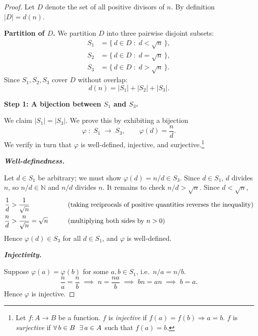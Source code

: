\documentclass[12pt]{article}
\theoremstyle{remark}
\begin{document}
\begin{proof}
Let $D$ denote the set of all positive divisors of $n$.  By definition
$|D| = d(n)$.

\smallskip
\noindent\textbf{Partition of $D$.}\;
We partition $D$ into three pairwise disjoint subsets:
\begin{align*}
    S_1 &= \bigl\{\, d \in D \;:\; d < \sqrt{n} \,\bigr\}, \\
    S_2 &= \bigl\{\, d \in D \;:\; d = \sqrt{n} \,\bigr\}, \\
    S_3 &= \bigl\{\, d \in D \;:\; d > \sqrt{n} \,\bigr\}.
\end{align*}
Since $S_1, S_2, S_3$ cover $D$ without overlap:
\[
    d(n) = |S_1| + |S_2| + |S_3|.
\]

\bigskip
\noindent\textbf{Step 1: A bijection between $S_1$ and $S_3$.}

We claim $|S_1| = |S_3|$. We prove this by exhibiting a bijection
\[
    \varphi \;:\; S_1 \;\longrightarrow\; S_3, \qquad \varphi(d) = \frac{n}{d}.
\]
We verify in turn that $\varphi$ is well-defined, injective, and
surjective.\footnote{%
  Let $f\colon A\to B$ be a function.
  $f$ is \emph{injective} if $f(a)=f(b)\Rightarrow a=b$.\;
  $f$ is \emph{surjective} if $\forall\,b\in B\ \thickspace \exists\,a\in A$ such that
  $f(a)=b$.}

\bigskip
\noindent\textbf{\textit{Well-definedness.}}

\smallskip
\noindent
Let $d \in S_1$ be arbitrary; we must show $\varphi(d) = n/d \in S_3$.
Since $d \in S_1$, $d$ divides $n$, so $n/d \in \mathbb{N}$ and
$n/d$ divides $n$. It remains to check $n/d > \sqrt{n}$. Since $d < \sqrt{n}$,
\begin{alignat}{2}
    \frac{1}{d} &> \frac{1}{\sqrt{n}}
        &\qquad& \text{(taking reciprocals of positive quantities reverses the inequality)} \notag \\
    \frac{n}{d} &> \frac{n}{\sqrt{n}} = \sqrt{n}
        &\qquad& \text{(multiplying both sides by $n > 0$)} \notag
\end{alignat}
Hence $\varphi(d) \in S_3$ for all $d \in S_1$, and $\varphi$ is well-defined.

\bigskip
\noindent\textbf{\textit{Injectivity.}}

\smallskip
\noindent
Suppose $\varphi(a) = \varphi(b)$ for some $a, b \in S_1$, i.e.\ $n/a = n/b$.
\[
    \frac{n}{a} = \frac{n}{b}
    \;\implies\; n = \frac{na}{b}
    \;\implies\; bn = an
    \;\implies\; b = a.
\]
Hence $\varphi$ is injective.


\end{proof}
\end{document}
